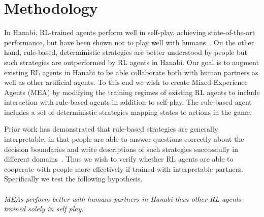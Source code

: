 \documentclass[letterpaper]{article} %
\begin{document}
\section{Methodology}


In Hanabi, RL-trained agents   perform well in self-play, achieving state-of-the-art performance, but have been shown not  to play well with humans~\cite{OP}.  
 On the other hand, rule-based, deterministic strategies   are  better understood by  people  but such strategies are outperformed by RL agents in Hanabi. 
 Our goal is to augment existing RL agents in Hanabi to be able collaborate both with human partners as well as other artificial agents. 
To this end we wish to create Mixed-Experience Agents (MEA) by modifying the training regimes of existing RL agents to include interaction with  rule-based agents in addition to self-play. The rule-based agent   includes a set of    deterministic strategies  mapping states to actions in the game. %
 
 Prior work    has demonstrated that rule-based strategies are generally  interpretable, in that people are able to answer questions correctly about the decision boundaries  and write descriptions of such strategies successfully in different domains~\cite{lakkaraju2016interpretable}.  Thus we wish to verify whether RL agents are able to cooperate with people more effectively if trained with interpretable partners. Specifically we 
 test the following hypothesis. 
 \paragraph{}
 \emph{MEAs perform better with humans partners in Hanabi than  other RL agents trained  solely in self play. }
 \paragraph{} 
\end{document}
